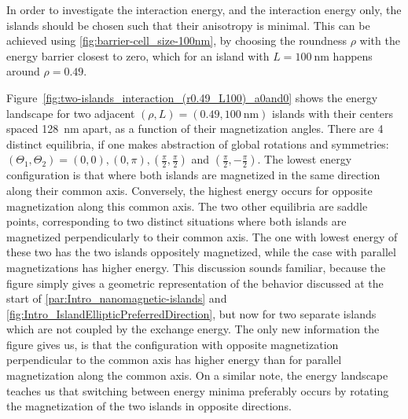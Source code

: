 \documentclass[11pt,a4paper,english]{article}
\begin{document}
In order to investigate the interaction energy, and the interaction energy only, the islands should be chosen such that their anisotropy is minimal. This can be achieved using \cref{fig:barrier-cell_size-100nm}, by choosing the roundness $\rho$ with the energy barrier closest to zero, which for an island with $L=\SI{100}{\nano\metre}$ happens around $\rho=0.49$. \par
Figure~\ref{fig:two-islands_interaction_(r0.49_L100)_a0and0} shows the energy landscape for two adjacent $(\rho, L)=(0.49, \SI{100}{\nano\metre})$ islands with their centers spaced \SI{128}{\nano\metre} apart, as a function of their magnetization angles. There are 4 distinct equilibria, if one makes abstraction of global rotations and symmetries: $(\Theta_1, \Theta_2) = (0,0), (0, \pi), (\frac{\pi}{2}, \frac{\pi}{2})$ and $(\frac{\pi}{2}, -\frac{\pi}{2})$. The lowest energy configuration is that where both islands are magnetized in the same direction along their common axis. Conversely, the highest energy occurs for opposite magnetization along this common axis. The two other equilibria are saddle points, corresponding to two distinct situations where both islands are magnetized perpendicularly to their common axis. The one with lowest energy of these two has the two islands oppositely magnetized, while the case with parallel magnetizations has higher energy. This discussion sounds familiar, because the figure simply gives a geometric representation of the behavior discussed at the start of \cref{par:Intro_nanomagnetic-islands} and \cref{fig:Intro_IslandEllipticPreferredDirection}, but now for two separate islands which are not coupled by the exchange energy. The only new information the figure gives us, is that the configuration with opposite magnetization perpendicular to the common axis has higher energy than for parallel magnetization along the common axis. On a similar note, the energy landscape teaches us that switching between energy minima preferably occurs by rotating the magnetization of the two islands in opposite directions. \par
\end{document}
